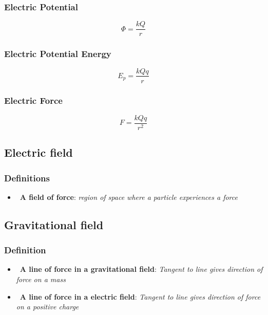 \documentclass[a4paper,9pt]{scrartcl}
\begin{document}
    \subsubsection{Electric Potential}
    \begin{displaymath}
        \Phi = \frac{kQ}{r}
    \end{displaymath}

    \subsubsection{Electric Potential Energy}
    \begin{displaymath}
        E_p = \frac{kQq}{r}
    \end{displaymath}

    \subsubsection{Electric Force}
    \begin{displaymath}
        F = \frac{kQq}{r^2}
    \end{displaymath}

    \subsection{Electric field}

    \subsubsection{Definitions}
    \begin{itemize}
        \item~\textbf{A field of force}: \textit{region of space where a particle experiences a force}
    \end{itemize}

    \subsection{Gravitational field}

    \subsubsection{Definition}

    \begin{itemize}
        \item~\textbf{A line of force in a gravitational field}: \textit{Tangent to line gives direction of force on a mass}
        \item~\textbf{A line of force in a electric field}: \textit{Tangent to line gives direction of force on a positive charge}
    \end{itemize}
\end{document}
